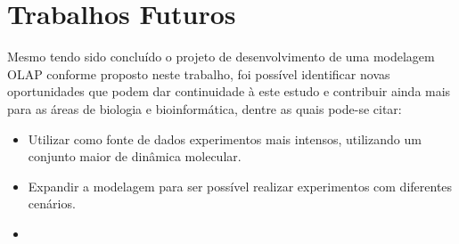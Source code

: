\chapter{Trabalhos Futuros}
	Mesmo tendo sido concluído o projeto de desenvolvimento de uma modelagem OLAP conforme proposto neste trabalho, foi possível identificar novas oportunidades que podem dar continuidade à este estudo e contribuir ainda mais para as áreas de biologia e bioinformática, dentre as quais pode-se citar:

\begin{itemize}
 	\item Utilizar como fonte de dados experimentos mais intensos, utilizando um conjunto maior de dinâmica molecular.
 	\item Expandir a modelagem para ser possível realizar experimentos com diferentes cenários.
 	\item

\end{itemize}